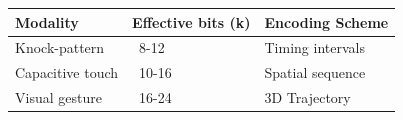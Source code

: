 \begin{tabular}{lll}
\toprule
Modality & Effective bits (k) & Encoding Scheme \\
\midrule
Knock-pattern & ~8-12 & Timing intervals \\
Capacitive touch & ~10-16 & Spatial sequence \\
Visual gesture & ~16-24 & 3D Trajectory \\
\bottomrule
\end{tabular}
